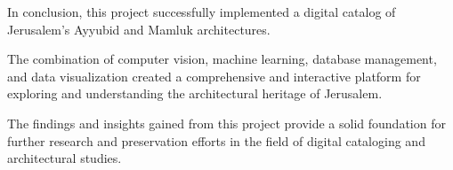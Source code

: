 In conclusion, this project successfully implemented a digital catalog of Jerusalem's Ayyubid and Mamluk architectures. 

The combination of computer vision, machine learning, database management, and data visualization created a comprehensive and interactive platform for exploring and understanding the architectural heritage of Jerusalem. 

The findings and insights gained from this project provide a solid foundation for further research and preservation efforts in the field of digital cataloging and architectural studies.